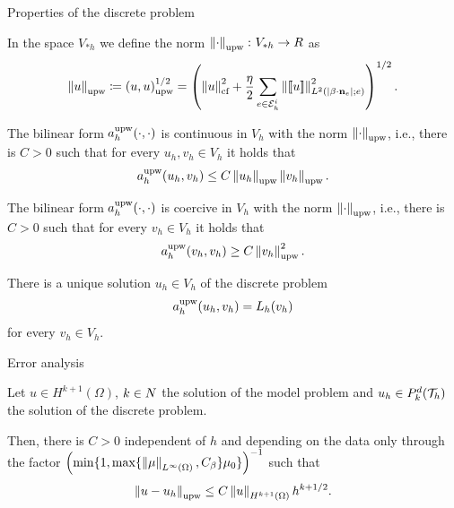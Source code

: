 	\begin{frame}[allowframebreaks]{Properties of the discrete problem}
	\begin{definicion}
		In the space $V_{*h}$ we define the norm $\left\|\cdot\right\|_{\text{upw}}\colon V_{*h}\to\relax R$ as $$\left\|u\right\|_{\text{upw}}\coloneqq\left(u,u\right)_\text{upw}^{1/2}= \left(\left\|u\right\|_{\text{cf}}^2+\frac{\eta}{2}\sum_{e\in\mathcal{E}_h^i}\left\|\left[\!\left[u\right]\!\right]\right\|^2_{L^2(|\beta\cdot\mathbf{n}_e|;e)} \right)^{1/2}.$$
	\end{definicion}
	\framebreak
	\begin{lemma}
		The bilinear form $a_h^{\text{upw}}(\cdot,\cdot)$ is continuous in $V_h$ with the norm $\left\|\cdot\right\|_{\text{upw}}$, i.e., there is $C>0$ such that for every $u_h,v_h\in V_h$ it holds that $$a_h^{\text{upw}}(u_h,v_h)\leq C\left\|u_h\right\|_{\text{upw}}\left\|v_h\right\|_{\text{upw}}.$$
	\end{lemma}
	
	\begin{proposition}
		The bilinear form $a_h^{\text{upw}}(\cdot,\cdot)$ is coercive in $V_h$ with the norm $\left\|\cdot\right\|_{\text{upw}}$, i.e., there is $C>0$ such that for every $v_h\in V_h$ it holds that $$a_h^{\text{upw}}(v_h,v_h)\geq C\left\|v_h\right\|_{\text{upw}}^2.$$
	\end{proposition}
	\framebreak
	\begin{lemma}
		There is a unique solution $u_h\in V_h$ of the discrete problem $$a_h^{\text{upw}}(u_h,v_h)=L_h(v_h)$$ for every $v_h\in V_h$.
	\end{lemma}
	\end{frame}
	
	\begin{frame}{Error analysis}
	\begin{theorem}
		Let $u\in H^{k+1}(\Omega)$, $k\in\relax N$ the solution of the model problem and $u_h\in \relax{P}_k^d(\mathcal{T}_h)$ the solution of the discrete problem.
		
		Then, there is $C>0$ independent of $h$ and depending on the data only through the factor  $\left(\min\{1,\max\{\left\|\mu\right\|_{L^\infty(\Omega)},C_\beta\}\mu_0\}\right)^{-1}$ such that $$\left\|u-u_h\right\|_{\text{upw}}\leq C\left\|u\right\|_{H^{k+1}(\Omega)}h^{k+1/2}.$$
	\end{theorem}
\end{frame}

